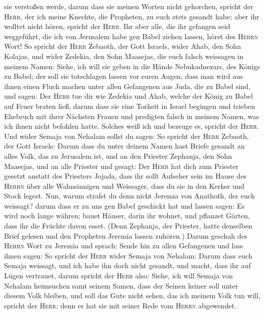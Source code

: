 sie verstoßen werde,  darum dass sie meinen Worten nicht
gehorchen, spricht der \textsc{Herr}, der ich meine Knechte, die
Propheten, zu euch stets gesandt habe; aber ihr wolltet nicht hören,
spricht der \textsc{Herr}.  Ihr aber alle, die ihr
gefangen seid weggeführt, die ich von Jerusalem habe gen Babel ziehen
lassen, höret des \textsc{Herrn} Wort!  So spricht der
\textsc{Herr} Zebaoth, der Gott Israels, wider Ahab, den Sohn Kolajas,
und wider Zedekia, den Sohn Maasejas, die euch falsch weissagen in
meinem Namen: Siehe, ich will sie geben in die Hände Nebukadnezars, des
Königs zu Babel; der soll sie totschlagen lassen vor euren Augen,
 dass man wird aus ihnen einen Fluch machen unter allen
Gefangenen aus Juda, die zu Babel sind, und sagen: Der \textsc{Herr} tue
dir wie Zedekia und Ahab, welche der König zu Babel auf Feuer braten
ließ,  darum dass sie eine Torheit in Israel begingen und
trieben Ehebruch mit ihrer Nächsten Frauen und predigten falsch in
meinem Namen, was ich ihnen nicht befohlen hatte. Solches weiß ich und
bezeuge es, spricht der \textsc{Herr}.  Und wider Semaja
von Nehalam sollst du sagen:  So spricht der
\textsc{Herr} Zebaoth, der Gott Israels: Darum dass du unter deinem
Namen hast Briefe gesandt an alles Volk, das zu Jerusalem ist, und an
den Priester Zephanja, den Sohn Maasejas, und an alle Priester und
gesagt:  Der \textsc{Herr} hat dich zum Priester gesetzt
anstatt des Priesters Jojada, dass ihr sollt Aufseher sein im Hause des
\textsc{Herrn} über alle Wahnsinnigen und Weissager, dass du sie in den
Kerker und Stock legest.  Nun, warum strafst du denn
nicht Jeremia von Anathoth, der euch weissagt?  darum
dass er zu uns gen Babel geschickt hat und lassen sagen: Es wird noch
lange währen; bauet Häuser, darin ihr wohnet, und pflanzet Gärten, dass
ihr die Früchte davon esset.  (Denn Zephanja, der
Priester, hatte denselben Brief gelesen und den Propheten Jeremia lassen
zuhören.)  Darum geschah des \textsc{Herrn} Wort zu
Jeremia und sprach:  Sende hin zu allen Gefangenen und
lass ihnen sagen: So spricht der \textsc{Herr} wider Semaja von Nehalam:
Darum dass euch Semaja weissagt, und ich habe ihn doch nicht gesandt,
und macht, dass ihr auf Lügen vertrauet,  darum spricht
der \textsc{Herr} also: Siehe, ich will Semaja von Nehalam heimsuchen
samt seinem Samen, dass der Seinen keiner soll unter diesem Volk
bleiben, und soll das Gute nicht sehen, das ich meinem Volk tun will,
spricht der \textsc{Herr}; denn er hat sie mit seiner Rede vom
\textsc{Herrn} abgewendet.

